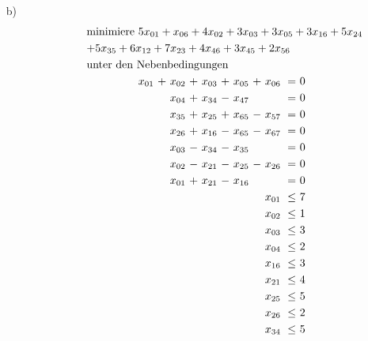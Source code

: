 \documentclass [a4paper,11pt]{article}
\begin{document}
\begin{enumerate}
\begin{enumerate}
            \item[b)]
                \begin{align*}
                \begin{alignedat}{8}
                & \text{minimiere } \rlap{$ 5x_{01}+x_{06}+4x_{02}+3x_{03}+3x_{05}+3x_{16}+5x_{24} $} &&&&&&&&&&&\\
                & \rlap{$ +5x_{35}+6x_{12}+7x_{23}+4x_{46}+3x_{45}+2x_{56} $} &&&&&&&&&&&\\
                & \rlap{unter den Nebenbedingungen} & & & & & & & & & & & \\
                &&   x_{01} &\ + &\ x_{02} &\ + &\ x_{03} &\ + &\ x_{05} &\ +    &\ x_{06} &\ = &\ 0 \\
                &&&& x_{04} &\ + &\ x_{34} &\ - &\ x_{47} &    &         &\    = &\ 0 \\
                &&&& x_{35} &\ + &\ x_{25} &\ + &\ x_{65} &\ - &\ x_{57} &\    = &\ 0 \\
                &&&& x_{26} &\ + &\ x_{16} &\ - &\ x_{65} &\ - &\ x_{67} &\    = &\ 0 \\
                &&&& x_{03} &\ - &\ x_{34} &\ - &\ x_{35} &    &         &\    = &\ 0 \\
                &&&& x_{02} &\ - &\ x_{21} &\ - &\ x_{25} &\ - &\ x_{26} &\    = &\ 0 \\
                &&&& x_{01} &\ + &\ x_{21} &\ - &\ x_{16} &    &         &\    = &\ 0 \\
                &&&&        &    &         &    &         &    &\ x_{01} &\ \leq &\ 7 \\
                &&&&        &    &         &    &         &    &\ x_{02} &\ \leq &\ 1 \\
                &&&&        &    &         &    &         &    &\ x_{03} &\ \leq &\ 3 \\
                &&&&        &    &         &    &         &    &\ x_{04} &\ \leq &\ 2 \\
                &&&&        &    &         &    &         &    &\ x_{16} &\ \leq &\ 3 \\
                &&&&        &    &         &    &         &    &\ x_{21} &\ \leq &\ 4 \\
                &&&&        &    &         &    &         &    &\ x_{25} &\ \leq &\ 5 \\
                &&&&        &    &         &    &         &    &\ x_{26} &\ \leq &\ 2 \\
                &&&&        &    &         &    &         &    &\ x_{34} &\ \leq &\ 5 \\

\end{alignedat}
\end{align*}
\end{enumerate}
\end{enumerate}
\end{document}

